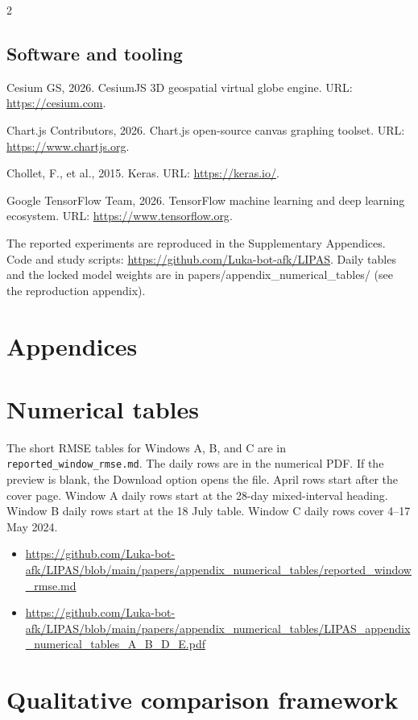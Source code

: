 \begin{multicols}{2}
\subsection*{Software and tooling}
Cesium GS, 2026. CesiumJS 3D geospatial virtual globe engine. URL: \url{https://cesium.com}.

Chart.js Contributors, 2026. Chart.js open-source canvas graphing toolset. URL: \url{https://www.chartjs.org}.

Chollet, F., et al., 2015. Keras. URL: \url{https://keras.io/}.

Google TensorFlow Team, 2026. TensorFlow machine learning and deep learning ecosystem. URL: \url{https://www.tensorflow.org}.

The reported experiments are reproduced in the Supplementary Appendices. Code and study scripts: \url{https://github.com/Luka-bot-afk/LIPAS}. Daily tables and the locked model weights are in papers/appendix\_numerical\_tables/ (see the reproduction appendix).
\end{multicols}
\appendix
\onecolumn
\section*{Appendices}
\section{Numerical tables}

The short RMSE tables for Windows A, B, and C are in \texttt{reported\_window\_rmse.md}. The daily rows are in the numerical PDF. If the preview is blank, the Download option opens the file. April rows start after the cover page. Window A daily rows start at the 28-day mixed-interval heading. Window B daily rows start at the 18 July table. Window C daily rows cover 4--17 May 2024.

\begin{itemize}
\item \url{https://github.com/Luka-bot-afk/LIPAS/blob/main/papers/appendix_numerical_tables/reported_window_rmse.md}
\item \url{https://github.com/Luka-bot-afk/LIPAS/blob/main/papers/appendix_numerical_tables/LIPAS_appendix_numerical_tables_A_B_D_E.pdf}
\end{itemize}

\section{Qualitative comparison framework}

